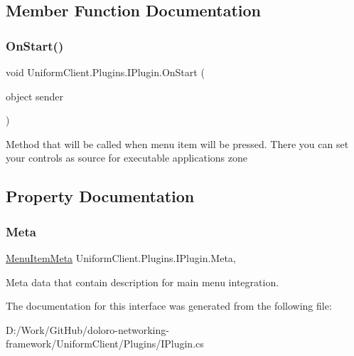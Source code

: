 \subsection{Member Function Documentation}
\mbox{\label{interface_uniform_client_1_1_plugins_1_1_i_plugin_a1ca2220c7ce4a23f8f41af10efccf328}} 
\subsubsection{\texorpdfstring{On\+Start()}{OnStart()}}
{\footnotesize\ttfamily void Uniform\+Client.\+Plugins.\+I\+Plugin.\+On\+Start (\begin{DoxyParamCaption}\item[{object}]{sender }\end{DoxyParamCaption})}



Method that will be called when menu item will be pressed. There you can set your controls as source for executable application\textquotesingle{}s zone 



\subsection{Property Documentation}
\mbox{\label{interface_uniform_client_1_1_plugins_1_1_i_plugin_aa49e267e66a3d697ded460d9281dcc3a}} 
\subsubsection{\texorpdfstring{Meta}{Meta}}
{\footnotesize\ttfamily \mbox{\hyperlink{class_uniform_client_1_1_plugins_1_1_menu_item_meta}{Menu\+Item\+Meta}} Uniform\+Client.\+Plugins.\+I\+Plugin.\+Meta\hspace{0.3cm}{\ttfamily [get]}, {\ttfamily [set]}}



Meta data that contain description for main menu integration. 



The documentation for this interface was generated from the following file\+:\begin{DoxyCompactItemize}
\item 
D\+:/\+Work/\+Git\+Hub/doloro-\/networking-\/framework/\+Uniform\+Client/\+Plugins/I\+Plugin.\+cs\end{DoxyCompactItemize}
